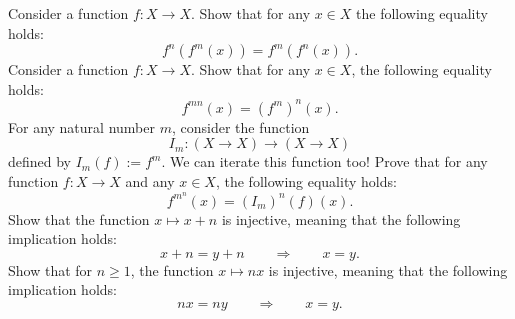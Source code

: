 \begin{foundational}
  \exercise Consider a function $f:X \to X$. Show that for any $x\in X$ the following equality holds:
  \begin{equation*}
    f^n(f^m(x))=f^m(f^n(x)).
  \end{equation*}
  \exercise Consider a function $f:X \to X$. Show that for any $x\in X$, the following equality holds:
  \begin{equation*}
    f^{mn}(x)=(f^m)^n(x).
  \end{equation*}
  \exercise For any natural number $m$, consider the function
  \begin{equation*}
    I_m : (X\to X) \to (X\to X)
  \end{equation*}
  defined by $I_m(f):= f^m$. We can iterate this function too! Prove that for any function $f:X\to X$ and any $x\in X$, the following equality holds:
  \begin{equation*}
    f^{m^n}(x) = (I_m)^n(f)(x).
  \end{equation*}
  \exercise Show that the function $x\mapsto x+n$ is injective, meaning that the following implication holds:
  \begin{equation*}
    x+n=y+n\qquad\Rightarrow\qquad x=y.
  \end{equation*}
  \exercise Show that for $n\geq 1$, the function $x\mapsto nx$ is injective, meaning that the following implication holds:
  \begin{equation*}
    nx = ny \qquad\Rightarrow\qquad x=y.
  \end{equation*}
\end{foundational}

